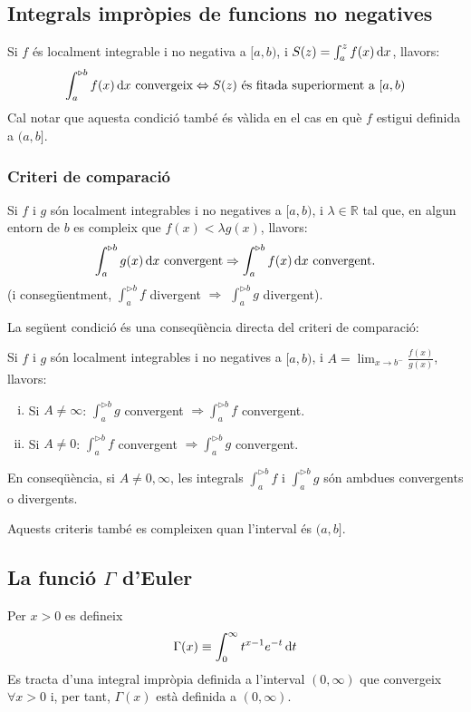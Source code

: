 \subsection{Integrals impròpies de funcions no negatives}
Si $f$ és localment integrable i no negativa a $[a, b)$, i $S(z) = \int_{a}^{z} f(x) \mathop{}\!\mathrm{d} x$, llavors:
\begin{align}
    \int_{a}^{\triangleright b}f(x) \mathop{}\!\mathrm{d} x \text{ convergeix} \Leftrightarrow S(z) \text{ és fitada superiorment a } [a, b)
\end{align}
Cal notar que aquesta condició també és vàlida en el cas en què $f$ estigui definida a $(a, b]$.

\subsubsection*{Criteri de comparació}
Si $f$ i $g$ són localment integrables i no negatives a $[a ,b)$, i $\lambda \in \mathbb{R}$ tal que, en algun entorn de $b$ es compleix que $f(x) < \lambda g(x)$, llavors:
\begin{align}
    \int_{a}^{\triangleright b} g(x) \mathop{}\!\mathrm{d} x \text{ convergent} \Rightarrow \int_{a}^{\triangleright b} f(x) \mathop{}\!\mathrm{d} x \text{ convergent}.
\end{align}
(i consegüentment, $\int_{a}^{\triangleright b} f$ divergent $\Rightarrow$ $\int_{a}^{\triangleright b} g$ divergent).

La següent condició és una conseqüència directa del criteri de comparació:

Si $f$ i $g$ són localment integrables i no negatives a $[a ,b)$, i $A = \lim_{x \to b^{-}} \frac{f(x)}{g(x)}$, llavors:
\begin{enumerate}[i)]
    \item Si $A \neq \infty$: $\int_{a}^{\triangleright b} g$ convergent $\Rightarrow \int_{a}^{\triangleright b} f$ convergent.
    \item Si $A \neq 0$: $\int_{a}^{\triangleright b} f$ convergent $\Rightarrow \int_{a}^{\triangleright b} g$ convergent.
\end{enumerate}
En conseqüència, si $A \neq 0, \infty$, les integrals $\int_{a}^{\triangleright b} f$ i $\int_{a}^{\triangleright b} g$ són ambdues convergents o divergents.

Aquests criteris també es compleixen quan l'interval és $(a, b]$.
\subsection{La funció $\Gamma$ d'Euler}
Per $x > 0$ es defineix
\begin{align}
    \Gamma (x) \equiv \int_{0}^{\infty} t^{x-1} e^{-t} \mathop{}\!\mathrm{d} t
\end{align}
Es tracta d'una integral impròpia definida a l'interval $(0 , \infty)$ que convergeix $\forall x > 0$ i, per tant, $\Gamma (x)$ està definida a $(0 , \infty)$.

